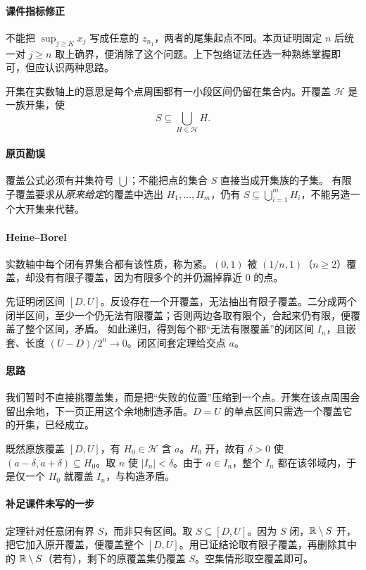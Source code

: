 \paragraph{课件指标修正}不能把 $\sup_{j\ge K}x_j$ 写成任意的 $z_{n_1}$，两者的尾集起点不同。本页证明固定 $n$ 后统一对 $j\ge n$ 取上确界，便消除了这个问题。上下包络证法任选一种熟练掌握即可，但应认识两种思路。

开集在实数轴上的意思是每个点周围都有一小段区间仍留在集合内。开覆盖 $\mathcal H$ 是一族开集，使
\[S\subseteq\bigcup_{H\in\mathcal H}H.\]
\paragraph{原页勘误}覆盖公式必须有并集符号 $\bigcup$；不能把点的集合 $S$ 直接当成开集族的子集。
有限子覆盖要求从\emph{原来给定}的覆盖中选出 $H_1,\ldots,H_m$，仍有 $S\subseteq\bigcup_{i=1}^mH_i$，不能另造一个大开集来代替。
\paragraph{Heine--Borel}实数轴中每个闭有界集合都有该性质，称为紧。$(0,1)$ 被 $(1/n,1)$（$n\ge2$）覆盖，却没有有限子覆盖，因为有限多个的并仍漏掉靠近 $0$ 的点。

先证明闭区间 $[D,U]$。反设存在一个开覆盖，无法抽出有限子覆盖。二分成两个闭半区间，至少一个仍无法有限覆盖；否则两边各取有限个，合起来仍有限，便覆盖了整个区间，矛盾。
如此递归，得到每个都“无法有限覆盖”的闭区间 $I_n$，且嵌套、长度 $(U-D)/2^n\to0$。闭区间套定理给交点 $a$。
\paragraph{思路}我们暂时不直接挑覆盖集，而是把“失败的位置”压缩到一个点。开集在该点周围会留出余地，下一页正用这个余地制造矛盾。$D=U$ 的单点区间只需选一个覆盖它的开集，已经成立。

既然原族覆盖 $[D,U]$，有 $H_0\in\mathcal H$ 含 $a$。$H_0$ 开，故有 $\delta>0$ 使 $(a-\delta,a+\delta)\subseteq H_0$。取 $n$ 使 $|I_n|<\delta$。由于 $a\in I_n$，整个 $I_n$ 都在该邻域内，于是仅一个 $H_0$ 就覆盖 $I_n$，与构造矛盾。
\paragraph{补足课件未写的一步}定理针对任意闭有界 $S$，而非只有区间。取 $S\subseteq[D,U]$。因为 $S$ 闭，$\mathbb{R}\setminus S$ 开，把它加入原开覆盖，便覆盖整个 $[D,U]$。用已证结论取有限子覆盖，再删除其中的 $\mathbb{R}\setminus S$（若有），剩下的原覆盖集仍覆盖 $S$。空集情形取空覆盖即可。
